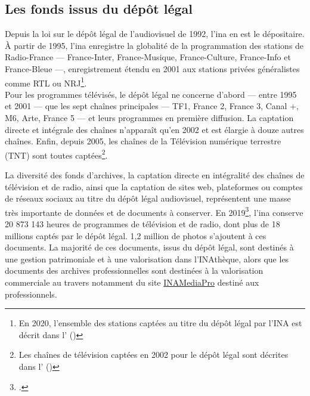\subsection{\label{I-B-1-b}Les fonds issus du dépôt légal}

Depuis la loi sur le dépôt légal de l'audiovisuel de 1992, l'\ac{ina} en est le dépositaire. À partir de 1995, l'\ac{ina} enregistre la globalité de la programmation des stations de Radio-France --- France-Inter, France-Musique, France-Culture, France-Info et France-Bleue ---, enregistrement étendu en 2001 aux stations privées généralistes comme RTL ou NRJ\footnote{En 2020, l'ensemble des stations captées au titre du dépôt légal par l'INA est décrit dans l' ()}.\\

Pour les programmes télévisés, le dépôt légal ne concerne d'abord --- entre 1995 et 2001 --- que les sept chaînes principales --- TF1, France 2, France 3, Canal +, M6, Arte, France 5 --- et leurs programmes en première diffusion. La captation directe et intégrale des chaînes n'apparaît qu'en 2002 et est élargie à douze autres chaînes. Enfin, depuis 2005, les chaînes de la Télévision numérique terrestre (TNT) sont toutes captées\footnote{Les chaînes de télévision captées en 2002 pour le dépôt légal sont décrites dans l' ()}.

\bigskip
\bigskip

La diversité des fonds d'archives, la captation directe en intégralité des chaînes de télévision et de radio, ainsi que la captation de sites web, plateformes ou comptes de réseaux sociaux au titre du dépôt légal audiovisuel, représentent une masse très importante de données et de documents à conserver. En 2019\footcite[p.5]{institut_national_de_laudiovisuel_rapport_2019}, l'\ac{ina} conserve 20 873 143 heures de programmes de télévision et de radio, dont plus de 18 millions captés par le dépôt légal. 1,2 million de photos s'ajoutent à ces documents. La majorité de ces documents, issus du dépôt légal, sont destinés à une gestion patrimoniale et à une valorisation dans l'INAthèque, alors que les documents des archives professionnelles sont destinées à la valorisation commerciale au travers notamment du site \href{https://www.inamediapro.com}{INAMediaPro} destiné aux professionnels.